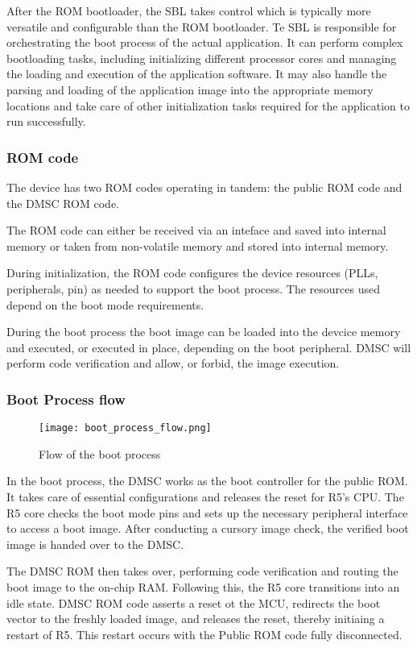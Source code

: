 After the ROM bootloader, the SBL takes control which is typically more
versatile and configurable than the ROM bootloader.
Te SBL is responsible for orchestrating the boot process of the actual
application.
It can perform complex bootloading tasks, including initializing different
processor cores and managing the loading and execution of the application
software. It may also handle the parsing and loading of the application image
into the appropriate memory locations and take care of other initialization
tasks required for the application to run successfully.

\subsubsection{ROM code}

The device has two ROM codes operating in tandem: the public ROM code and the
DMSC ROM code.

The ROM code can either be received via an inteface and saved into internal
memory or taken from non-volatile memory and stored into internal memory.

During initialization, the ROM code configures the device resources (PLLs,
peripherals, pin) as needed to support the boot process. The resources used
depend on the boot mode requirements.

During the boot process the boot image can be loaded into the devcice memory
and executed, or executed in place, depending on the boot peripheral.
DMSC will perform code verification and allow, or forbid, the image execution.

\subsubsection{Boot Process flow}

\begin{figure}
    \centering
    \texttt{[image: boot\_process\_flow.png]}
    \caption{Flow of the boot process}
\end{figure}

In the boot process, the DMSC works as the boot controller for the public ROM.
It takes care of essential configurations and releases the reset for R5's CPU.
The R5 core checks the boot mode pins and sets up the necessary peripheral
interface to access a boot image. After conducting a cursory image check, the
verified boot image is handed over to the DMSC.

The DMSC ROM then takes over, performing code verification and routing the boot
image to the on-chip RAM. Following this, the R5 core transitions into an idle
state. DMSC ROM code asserts a reset ot the MCU, redirects the boot vector to
the freshly loaded image, and releases the reset, thereby initiaing a restart
of R5. This restart occurs with the Public ROM code fully disconnected.

